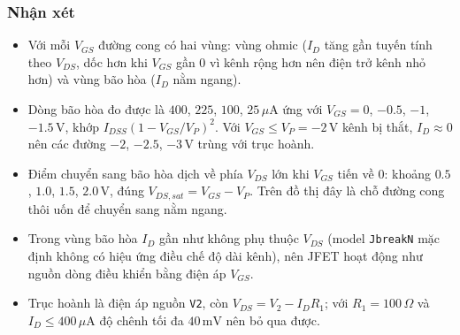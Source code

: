 \subsubsection*{Nhận xét}
\begin{remarkbox}
\begin{itemize}[nosep]
  \item Với mỗi $V_{GS}$ đường cong có hai vùng: vùng ohmic ($I_D$ tăng gần tuyến tính theo $V_{DS}$, dốc hơn khi $V_{GS}$ gần $0$ vì kênh rộng hơn nên điện trở kênh nhỏ hơn) và vùng bão hòa ($I_D$ nằm ngang).
  \item Dòng bão hòa đo được là $400$, $225$, $100$, $25\,\mu\text{A}$ ứng với $V_{GS} = 0$, $-0.5$, $-1$, $-1.5\,\text{V}$, khớp $I_{DSS}(1 - V_{GS}/V_P)^2$. Với $V_{GS} \le V_P = -2\,\text{V}$ kênh bị thắt, $I_D \approx 0$ nên các đường $-2$, $-2.5$, $-3\,\text{V}$ trùng với trục hoành.
  \item Điểm chuyển sang bão hòa dịch về phía $V_{DS}$ lớn khi $V_{GS}$ tiến về $0$: khoảng $0.5$, $1.0$, $1.5$, $2.0\,\text{V}$, đúng $V_{DS,sat} = V_{GS} - V_P$. Trên đồ thị đây là chỗ đường cong thôi uốn để chuyển sang nằm ngang.
  \item Trong vùng bão hòa $I_D$ gần như không phụ thuộc $V_{DS}$ (model \texttt{JbreakN} mặc định không có hiệu ứng điều chế độ dài kênh), nên JFET hoạt động như nguồn dòng điều khiển bằng điện áp $V_{GS}$.
  \item Trục hoành là điện áp nguồn \texttt{V2}, còn $V_{DS} = V_2 - I_D R_1$; với $R_1 = 100\,\Omega$ và $I_D \le 400\,\mu\text{A}$ độ chênh tối đa $40\,\text{mV}$ nên bỏ qua được.
\end{itemize}
\end{remarkbox}
